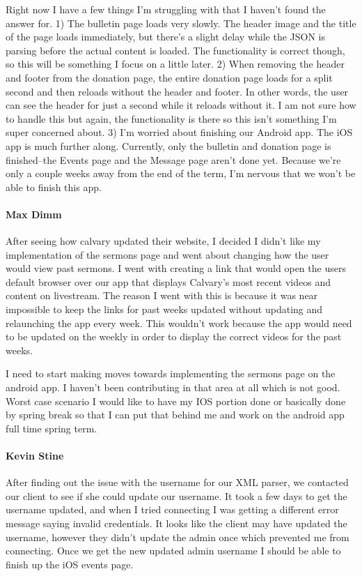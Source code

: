 Right now I have a few things I'm struggling with that I haven't found the answer for. 1) The bulletin page loads very slowly. The header image and the title of the page loads immediately, but there's a slight delay while the JSON is parsing before the actual content is loaded. The functionality is correct though, so this will be something I focus on a little later. 2) When removing the header and footer from the donation page, the entire donation page loads for a split second and then reloads without the header and footer. In other words, the user can see the header for just a second while it reloads without it. I am not sure how to handle this but again, the functionality is there so this isn't something I'm super concerned about. 3) I'm worried about finishing our Android app. The iOS app is much further along. Currently, only the bulletin and donation page is finished--the Events page and the Message page aren't done yet. Because we're only a couple weeks away from the end of the term, I'm nervous that we won't be able to finish this app.

			\paragraph{Max Dimm}
			After seeing how calvary updated their website, I decided I didn't like my implementation of the sermons page and went about changing how the user would view past sermons. I went with creating a link that would open the users default browser over our app that displays Calvary's most recent videos and content on livestream. The reason I went with this is because it was near impossible to keep the links for past weeks updated without updating and relaunching the app every week. This wouldn't work because the app would need to be updated on the weekly in order to display the correct videos for the past weeks.

I need to start making moves towards implementing the sermons page on the android app. I haven't been contributing in that area at all which is not good. Worst case scenario I would like to have my IOS portion done or basically done by spring break so that I can put that behind me and work on the android app full time spring term.

			\paragraph{Kevin Stine}
			After finding out the issue with the username for our XML parser, we contacted our client to see if she could update our username. It took a few days to get the username updated, and when I tried connecting I was getting a different error message saying invalid credentials. It looks like the client may have updated the username, however they didn't update the admin once which prevented me from connecting. Once we get the new updated admin username I should be able to finish up the iOS events page.


